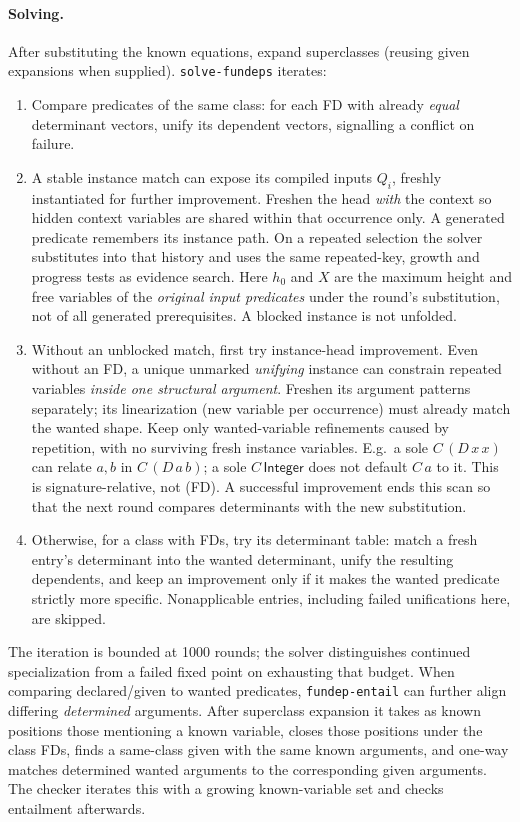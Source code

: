 \documentclass[11pt]{article}
\theoremstyle{definition}
\newcommand{\src}[1]{\nolinkurl{#1}}
\newcommand{\Int}{\mathsf{Integer}}
\begin{document}
\paragraph{Solving.}
After substituting the known equations, expand superclasses (reusing
given expansions when supplied). \src{solve-fundeps} iterates:
\begin{enumerate}
\item Compare predicates of the same class: for each FD with already
      \emph{equal} determinant vectors, unify its dependent vectors,
      signalling a conflict on failure.
\item A stable instance match can expose its compiled inputs
      $Q_i$, freshly instantiated for further improvement. Freshen the
      head \emph{with} the context so hidden context variables are shared
      within that occurrence only. A generated predicate remembers its
      instance path. On a repeated selection the solver substitutes into
      that history and uses the same repeated-key, growth and progress
      tests as evidence search.
      Here $h_0$ and $X$ are the maximum height and free variables of the
      \emph{original input predicates} under the round's substitution,
      not of all generated prerequisites. A blocked instance is not unfolded.
\item Without an unblocked match, first try instance-head improvement.
      Even without an FD, a unique unmarked \emph{unifying} instance can
      constrain repeated variables \emph{inside one structural argument}.
      Freshen its argument patterns separately; its linearization
      (new variable per occurrence) must already match the wanted shape.
      Keep only wanted-variable refinements caused by repetition, with no
      surviving fresh instance variables. E.g.\ a sole $C\,(D\,x\,x)$
      can relate $a,b$ in $C\,(D\,a\,b)$; a sole $C\,\Int$ does not
      default $C\,a$ to it. This is signature-relative, not (FD).
      A successful improvement ends this scan so that the next round
      compares determinants with the new substitution.
\item Otherwise, for a class with FDs, try its determinant table:
      match a fresh entry's determinant into the wanted determinant,
      unify the resulting dependents, and keep an improvement only if
      it makes the wanted predicate strictly more specific. Nonapplicable
      entries, including failed unifications here, are skipped.
\end{enumerate}
The iteration is bounded at 1000 rounds; the solver distinguishes continued
specialization from a failed fixed point on exhausting that budget. When
comparing declared/given to wanted predicates, \src{fundep-entail} can
further align differing \emph{determined} arguments. After superclass
expansion it takes as known positions those mentioning a known variable,
closes those positions under the class FDs, finds a same-class given with
the same known arguments, and one-way matches determined wanted arguments
to the corresponding given arguments. The checker iterates this with a
growing known-variable set and checks entailment afterwards.
\end{document}
